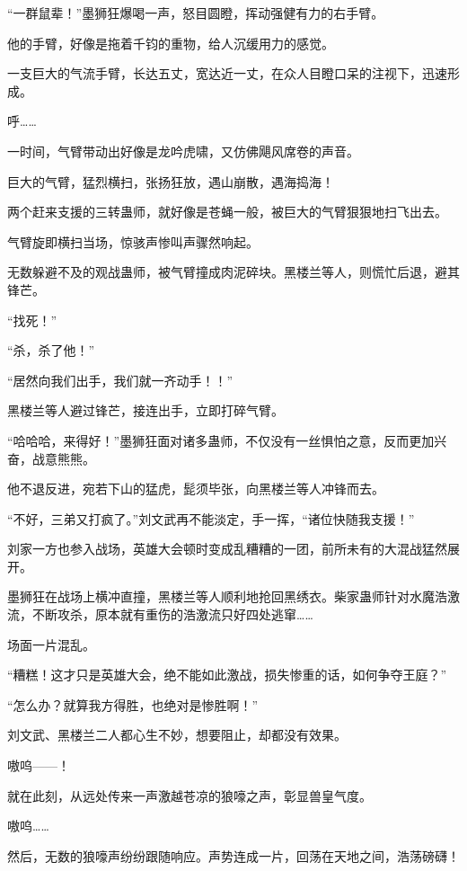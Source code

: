 \begin{this_body}
“一群鼠辈！”墨狮狂爆喝一声，怒目圆瞪，挥动强健有力的右手臂。

他的手臂，好像是拖着千钧的重物，给人沉缓用力的感觉。

一支巨大的气流手臂，长达五丈，宽达近一丈，在众人目瞪口呆的注视下，迅速形成。

呼……

一时间，气臂带动出好像是龙吟虎啸，又仿佛飓风席卷的声音。

巨大的气臂，猛烈横扫，张扬狂放，遇山崩散，遇海捣海！

两个赶来支援的三转蛊师，就好像是苍蝇一般，被巨大的气臂狠狠地扫飞出去。

气臂旋即横扫当场，惊骇声惨叫声骤然响起。

无数躲避不及的观战蛊师，被气臂撞成肉泥碎块。黑楼兰等人，则慌忙后退，避其锋芒。

“找死！”

“杀，杀了他！”

“居然向我们出手，我们就一齐动手！！”

黑楼兰等人避过锋芒，接连出手，立即打碎气臂。

“哈哈哈，来得好！”墨狮狂面对诸多蛊师，不仅没有一丝惧怕之意，反而更加兴奋，战意熊熊。

他不退反进，宛若下山的猛虎，髭须毕张，向黑楼兰等人冲锋而去。

“不好，三弟又打疯了。”刘文武再不能淡定，手一挥，“诸位快随我支援！”

刘家一方也参入战场，英雄大会顿时变成乱糟糟的一团，前所未有的大混战猛然展开。

墨狮狂在战场上横冲直撞，黑楼兰等人顺利地抢回黑绣衣。柴家蛊师针对水魔浩激流，不断攻杀，原本就有重伤的浩激流只好四处逃窜……

场面一片混乱。

“糟糕！这才只是英雄大会，绝不能如此激战，损失惨重的话，如何争夺王庭？”

“怎么办？就算我方得胜，也绝对是惨胜啊！”

刘文武、黑楼兰二人都心生不妙，想要阻止，却都没有效果。

嗷呜——！

就在此刻，从远处传来一声激越苍凉的狼嚎之声，彰显兽皇气度。

嗷呜……

然后，无数的狼嚎声纷纷跟随响应。声势连成一片，回荡在天地之间，浩荡磅礴！

\end{this_body}

